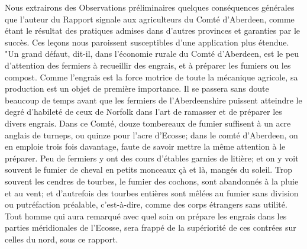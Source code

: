 Nous extrairons des Observations préliminaires quelques conséquences générales que l'auteur du Rapport signale aux agriculteurs du Comté d'Aberdeen, comme étant le résultat des pratiques admises dans d'autres provinces et garanties par le succès. Ces leçons nous paroissent susceptibles d'une application plus étendue.
"Un grand défaut, dit-il, dans l'économie rurale du Comté d'Aberdeen, est le peu d'attention des fermiers à recueillir des engrais, et à préparer les fumiers ou les compost. Comme l'engrais est la force motrice\setcounter{page}{343} de toute la mécanique agricole, sa production est un objet de première importance. Il se passera sans doute beaucoup de temps avant que les fermiers de l'Aberdeenshire puissent atteindre le degré d'habileté de ceux de Norfolk dans l'art de ramasser et de préparer les divers engrais. Dans ce Comté, douze tombereaux de fumier suffisent à un acre anglais de turneps, ou quinze pour l'acre d'Ecosse; dans le comté d'Aberdeen, on en emploie trois fois davantage, faute de savoir mettre la même attention à le préparer. Peu de fermiers y ont des cours d'étables garnies de litière; et on y voit souvent le fumier de cheval en petits monceaux çà et là, mangés du soleil. Trop souvent les cendres de tourbes, le fumier des cochons, sont abandonnés à la pluie et au vent; et d'autrefois des tourbes entières sont mêlées au fumier sans division ou putréfaction préalable, c'est-à-dire, comme des corps étrangers sans utilité. Tout homme qui aura remarqué avec quel soin on prépare les engrais dans les parties méridionales de l'Ecosse, sera frappé de la supériorité de ces contrées sur celles du nord, sous ce rapport.
